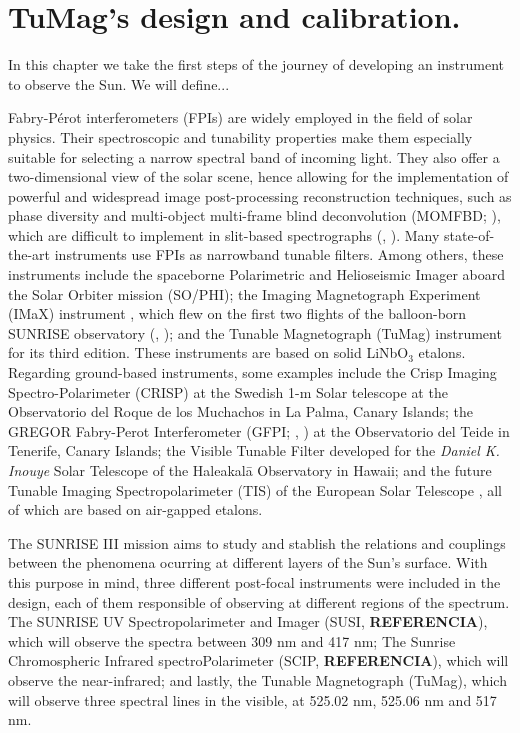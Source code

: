 \chapter{TuMag's design and calibration.}

In this chapter we take the first steps of the journey of developing an instrument to observe the Sun. We will define... 

Fabry-Pérot interferometers (FPIs) are widely employed in the field of solar physics. Their spectroscopic and tunability properties make them especially suitable for selecting a narrow spectral band of incoming light. They also offer a two-dimensional view of the solar scene, hence allowing for the implementation of powerful and widespread image post-processing reconstruction techniques, such as phase diversity \citep{PD_etalon} and multi-object multi-frame blind deconvolution (MOMFBD; \citealt{mombfd}), which are difficult to implement in slit-based spectrographs (\citealt{image_spectro}, \citealt{image_spectro_2}). Many state-of-the-art instruments use FPIs as narrowband tunable filters. Among others, these instruments include the spaceborne Polarimetric and Helioseismic Imager \citep[][]{PHI} aboard the Solar Orbiter mission \citep[][]{SO} (SO/PHI); the Imaging Magnetograph Experiment (IMaX) instrument \citep[][]{IMaX}, which flew on the first two flights of the balloon-born SUNRISE observatory (\citealt{SunriseI}, \citealt{SunriseII}); and the Tunable Magnetograph (TuMag) instrument for its third edition. These instruments are based on solid LiNbO$_3$ etalons. Regarding ground-based instruments, some examples include the Crisp Imaging Spectro-Polarimeter (CRISP) at the Swedish 1-m Solar telescope \citep[][]{crisp} at the Observatorio del Roque de los Muchachos in La Palma, Canary Islands; the GREGOR Fabry-Perot Interferometer (GFPI; \citealt{GFPI}, \citealt{GREGOR}) at the Observatorio del Teide in Tenerife, Canary Islands; the Visible Tunable Filter \citep[VTF;][]{VTF} developed for the \textit{Daniel K. Inouye} Solar Telescope \citep[DKIST;][]{DKIST} of the Haleakal\=a Observatory in Hawaii; and the future Tunable Imaging Spectropolarimeter (TIS) of the European Solar Telescope \citep{EST}, all of which are based on air-gapped etalons. 




The SUNRISE III mission aims to study and stablish the relations and couplings between the phenomena ocurring at different layers of the Sun's surface. With this purpose in mind, three different post-focal instruments were included in the design, each of them responsible of observing at different regions of the spectrum. The SUNRISE UV Spectropolarimeter and Imager (SUSI, \textbf{REFERENCIA}), which will observe the spectra between 309 nm and 417 nm; The Sunrise Chromospheric Infrared spectroPolarimeter (SCIP, \textbf{REFERENCIA}), which will observe the near-infrared; and lastly, the Tunable Magnetograph (TuMag), which will observe three spectral lines in the visible, at 525.02 nm, 525.06 nm and 517 nm. 

